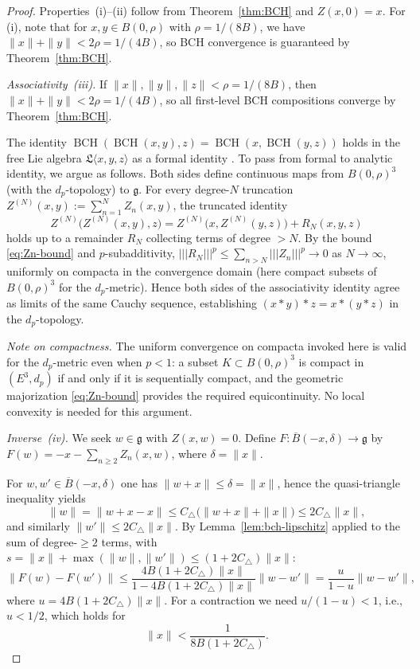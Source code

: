 \documentclass[10pt]{amsart}
\theoremstyle{definition}
\theoremstyle{remark}
\numberwithin{equation}{section}
\DeclareMathOperator{\BCH}{BCH}
\newcommand{\Ctri}{C_{\triangle}}    %
\newcommand{\Cbracket}{B}            %
\newcommand{\pnorm}[1]{\left\vert\!\left\vert\!\left\vert #1 \right\vert\!\right\vert\!\right\vert} %
\begin{document}
\begin{proof}
Properties~(i)--(ii) follow from Theorem~\ref{thm:BCH} and $Z(x,0)=x$.
For (i), note that for $x,y\in B(0,\rho)$ with $\rho=1/(8\Cbracket)$, we have
$\|x\|+\|y\| < 2\rho = 1/(4\Cbracket)$, so BCH convergence is guaranteed by
Theorem~\ref{thm:BCH}.

\smallskip
\noindent\emph{Associativity~(iii).}
If $\|x\|,\|y\|,\|z\| < \rho = 1/(8\Cbracket)$, then
$\|x\|+\|y\| < 2\rho = 1/(4\Cbracket)$, so all first-level BCH compositions converge by
Theorem~\ref{thm:BCH}.

The identity $\BCH(\BCH(x,y),z) = \BCH(x,\BCH(y,z))$ holds in the free Lie algebra
$\mathfrak{L}\langle x,y,z\rangle$ as a formal identity \cite[Ch.~II, \S6,
Prop.~2]{Bourbaki1989}.  To pass from formal to analytic identity, we argue as follows.
Both sides define continuous maps from $B(0,\rho)^3$ (with the $d_p$-topology) to
$\mathfrak{g}$.  For every degree-$N$ truncation $Z^{(N)}(x,y) := \sum_{n=1}^N Z_n(x,y)$,
the truncated identity
\[
  Z^{(N)}\bigl(Z^{(N)}(x,y),z\bigr) = Z^{(N)}\bigl(x,Z^{(N)}(y,z)\bigr) + R_N(x,y,z)
\]
holds up to a remainder $R_N$ collecting terms of degree $> N$.  By the bound
\eqref{eq:Zn-bound} and $p$-subadditivity, $\pnorm{R_N}^p \le \sum_{n>N}\pnorm{Z_n}^p
\to 0$ as $N\to\infty$, uniformly on compacta in the convergence domain
(here compact subsets of $B(0,\rho)^3$ for the $d_p$-metric).
Hence both sides of the associativity identity agree as limits of the same Cauchy
sequence, establishing $(x*y)*z = x*(y*z)$ in the $d_p$-topology.

\medskip\noindent\textit{Note on compactness.}
The uniform convergence on compacta invoked here is valid for the $d_p$-metric even when
$p < 1$: a subset $K \subset B(0,\rho)^3$ is compact in $(E^3, d_p)$ if and only if it
is sequentially compact, and the geometric majorization \eqref{eq:Zn-bound} provides the
required equicontinuity.  No local convexity is needed for this argument.

\smallskip
\noindent\emph{Inverse~(iv).}
We seek $w\in\mathfrak{g}$ with $Z(x,w)=0$.  Define
$F: \overline{B}(-x, \delta) \to \mathfrak{g}$ by
$F(w) = -x - \sum_{n\ge 2} Z_n(x,w)$, where $\delta = \|x\|$.

For $w, w' \in \overline{B}(-x,\delta)$ one has $\|w+x\|\le\delta=\|x\|$, hence the
quasi-triangle inequality yields
\[
  \|w\| = \|w+x-x\| \le \Ctri\bigl(\|w+x\|+\|x\|\bigr) \le 2\Ctri\|x\|,
\]
and similarly $\|w'\| \le 2\Ctri\|x\|$.  By
Lemma~\ref{lem:bch-lipschitz} applied to the sum of degree-$\ge 2$ terms, with
$s = \|x\|+\max(\|w\|,\|w'\|) \le (1+2\Ctri)\|x\|$:
\[
  \|F(w)-F(w')\|
  \le \frac{4\Cbracket(1+2\Ctri)\|x\|}{1-4\Cbracket(1+2\Ctri)\|x\|}\|w-w'\|
  = \frac{u}{1-u}\|w-w'\|,
\]
where $u = 4\Cbracket(1+2\Ctri)\|x\|$.  For a contraction we need $u/(1-u) < 1$, i.e.,
$u < 1/2$, which holds for
\begin{equation}\label{eq:contraction-cond}
  \|x\| < \frac{1}{8\Cbracket(1+2\Ctri)}.
\end{equation}


\end{proof}
\end{document}

